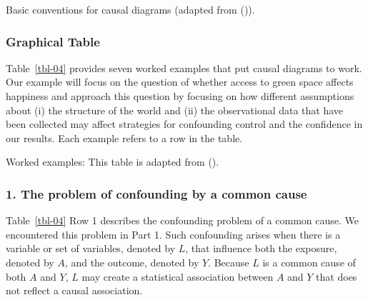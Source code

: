 \documentclass[
  singlecolumn]{article}
\begin{document}
\begin{table}

\caption{\label{tbl-02}Basic conventions for causal diagrams (adapted
from ()).}

\centering{

\terminologygeneralbasic

}

\end{table}%

\subsubsection{Graphical Table}\label{graphical-table}

Table~\ref{tbl-04} provides seven worked examples that put causal
diagrams to work. Our example will focus on the question of whether
access to green space affects happiness and approach this question by
focusing on how different assumptions about (i) the structure of the
world and (ii) the observational data that have been collected may
affect strategies for confounding control and the confidence in our
results. Each example refers to a row in the table.

\begin{table}

\caption{\label{tbl-04}Worked examples: This table is adapted from
().}

\centering{

\terminologyelconfoundersLONG

}

\end{table}%

\subsubsection{1. The problem of confounding by a common
cause}\label{the-problem-of-confounding-by-a-common-cause}

Table~\ref{tbl-04} Row 1 describes the confounding problem of a common
cause. We encountered this problem in Part 1. Such confounding arises
when there is a variable or set of variables, denoted by \(L\), that
influence both the exposure, denoted by \(A\), and the outcome, denoted
by \(Y.\) Because \(L\) is a common cause of both \(A\) and \(Y\), \(L\)
may create a statistical association between \(A\) and \(Y\) that does
not reflect a causal association.
\end{document}
